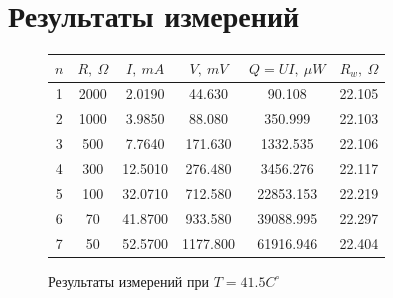 \documentclass[a4paper,12pt]{report}
\begin{document}
    \chapter{Результаты измерений}
    \begin{figure}[H]
        \centering
        \begin{tabular}{|c|c|c|c|c|c|}
            \hline
            $n$ & $R,\ \Omega$ & $I, \ mA$ & $V,\ mV$ & $Q=UI,\ \mu W$ & $R_{w}, \ \Omega$ \\
            \hline
            1 & 2000 & 2.0190 & 44.630 & 90.108 & 22.105 \\
            \hline
            2 & 1000 & 3.9850 & 88.080 & 350.999 & 22.103 \\
            \hline
            3 & 500 & 7.7640 & 171.630 & 1332.535 & 22.106 \\
            \hline
            4 & 300 & 12.5010 & 276.480 & 3456.276 & 22.117 \\
            \hline
            5 & 100 & 32.0710 & 712.580 & 22853.153 & 22.219 \\
            \hline
            6 & 70 & 41.8700 & 933.580 & 39088.995 & 22.297 \\
            \hline
            7 & 50 & 52.5700 & 1177.800 & 61916.946 & 22.404 \\
            \hline
        \end{tabular}
        \caption{Результаты измерений при $T=41.5C^\circ$}
    \end{figure}
\end{document}
